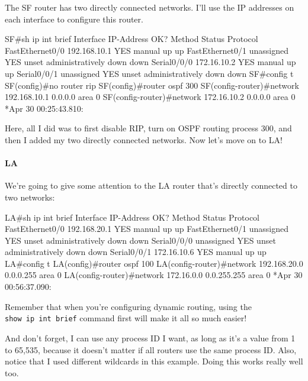 The SF router has two directly connected networks. I'll use the IP
addresses on each interface to configure this router.

\begin{cli}
SF#sh ip int brief
Interface    IP-Address      OK? Method Status                Protocol
FastEthernet0/0  192.168.10.1    YES manual up                    up
FastEthernet0/1  unassigned      YES unset  administratively down down
Serial0/0/0      172.16.10.2     YES manual up                    up
Serial0/0/1      unassigned      YES unset  administratively down down
SF#config t
SF(config)#no router rip
SF(config)#router ospf 300
SF(config-router)#network 192.168.10.1 0.0.0.0 area 0
SF(config-router)#network 172.16.10.2 0.0.0.0 area 0
*Apr 30 00:25:43.810: %
\end{cli}

Here, all I did was to first disable RIP, turn on OSPF routing process
300, and then I added my two directly connected networks. Now let's move
on to LA!

\paragraph{LA}

We're going to give some attention to the LA router that's directly
connected to two networks:

\begin{cli}
LA#sh ip int brief
Interface    IP-Address      OK? Method Status                Protocol
FastEthernet0/0 192.168.20.1    YES manual up                    up
FastEthernet0/1 unassigned      YES unset  administratively down down
Serial0/0/0     unassigned      YES unset  administratively down down
Serial0/0/1     172.16.10.6     YES manual up                    up
LA#config t
LA(config)#router ospf 100
LA(config-router)#network 192.168.20.0 0.0.0.255 area 0
LA(config-router)#network 172.16.0.0 0.0.255.255 area 0
*Apr 30 00:56:37.090: %
\end{cli}

Remember that when you're configuring dynamic routing, using the
\texttt{show\ ip\ int\ brief} command first will make it all so much
easier!

And don't forget, I can use any process ID I want, as long as it's a
value from 1 to 65,535, because it doesn't matter if all routers use the
same process ID. Also, notice that I used different wildcards in this
example. Doing this works really well too.

